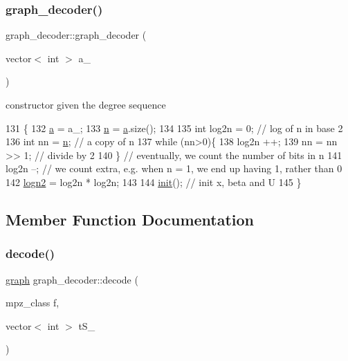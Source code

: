 \subsubsection{\texorpdfstring{graph\+\_\+decoder()}{graph\_decoder()}}
{\footnotesize\ttfamily graph\+\_\+decoder\+::graph\+\_\+decoder (\begin{DoxyParamCaption}\item[{vector$<$ int $>$}]{a\+\_\+ }\end{DoxyParamCaption})}



constructor given the degree sequence 


\begin{DoxyCode}
131 \{
132   \hyperlink{classgraph__decoder_a9dd7c3c11b8a45a12cb7c3c2d2bfa2cc}{a} = a\_;
133   \hyperlink{classgraph__decoder_a6bc1e72b2f7a913d14b789a6c2d92c1e}{n} = \hyperlink{classgraph__decoder_a9dd7c3c11b8a45a12cb7c3c2d2bfa2cc}{a}.size();
134 
135   \textcolor{keywordtype}{int} log2n = 0; \textcolor{comment}{// log of n in base 2}
136   \textcolor{keywordtype}{int} nn = \hyperlink{classgraph__decoder_a6bc1e72b2f7a913d14b789a6c2d92c1e}{n}; \textcolor{comment}{// a copy of n}
137   \textcolor{keywordflow}{while} (nn>0)\{
138     log2n ++;
139     nn = nn >> 1; \textcolor{comment}{// divide by 2}
140   \} \textcolor{comment}{// eventually, we count the number of bits in n}
141   log2n --; \textcolor{comment}{// we count extra, e.g. when n = 1, we end up having 1, rather than 0}
142   \hyperlink{classgraph__decoder_a59663482843ffa5059128bd6ed866f11}{logn2} = log2n * log2n;
143 
144   \hyperlink{classgraph__decoder_a97a9dcd5af21ece86fa91adcb41ca9cc}{init}(); \textcolor{comment}{// init x, beta and U}
145 \}
\end{DoxyCode}


\subsection{Member Function Documentation}
\mbox{\label{classgraph__decoder_a3d2ef81ec6ac66e50c1809f361143922}} 
\subsubsection{\texorpdfstring{decode()}{decode()}}
{\footnotesize\ttfamily \hyperlink{classgraph}{graph} graph\+\_\+decoder\+::decode (\begin{DoxyParamCaption}\item[{mpz\+\_\+class}]{f,  }\item[{vector$<$ int $>$}]{t\+S\+\_\+ }\end{DoxyParamCaption})}



